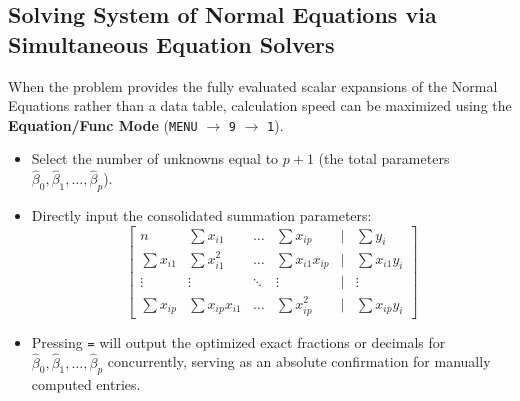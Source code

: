 \documentclass{article}
\begin{document}
\subsection{Solving System of Normal Equations via Simultaneous Equation Solvers}
When the problem provides the fully evaluated scalar expansions of the Normal Equations rather than a data table, calculation speed can be maximized using the \textbf{Equation/Func Mode} (\texttt{MENU} $\rightarrow$ \texttt{9} $\rightarrow$ \texttt{1}).
\begin{itemize}
    \item Select the number of unknowns equal to $p+1$ (the total parameters $\hat{\beta}_0, \hat{\beta}_1, \dots, \hat{\beta}_p$).
    \item Directly input the consolidated summation parameters:
    $$\begin{bmatrix}
    n & \sum x_{i1} & \dots & \sum x_{ip} & \big| & \sum y_i \\
    \sum x_{i1} & \sum x_{i1}^2 & \dots & \sum x_{i1}x_{ip} & \big| & \sum x_{i1}y_i \\
    \vdots & \vdots & \ddots & \vdots & \big| & \vdots \\
    \sum x_{ip} & \sum x_{ip}x_{i1} & \dots & \sum x_{ip}^2 & \big| & \sum x_{ip}y_i
    \end{bmatrix}$$
    \item Pressing \texttt{=} will output the optimized exact fractions or decimals for $\hat{\beta}_0, \hat{\beta}_1, \dots, \hat{\beta}_p$ concurrently, serving as an absolute confirmation for manually computed entries.
\end{itemize}
\end{document}

